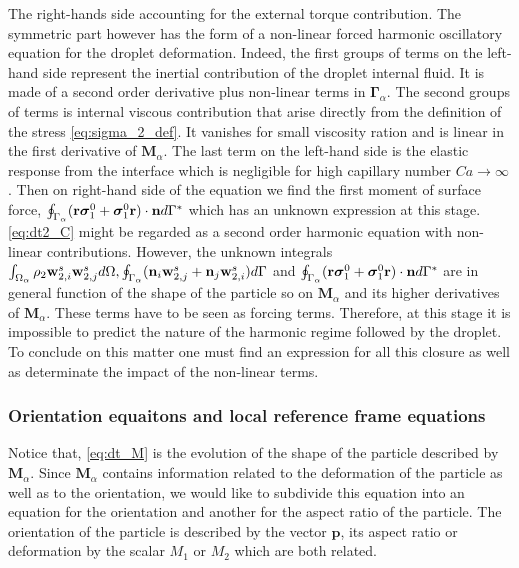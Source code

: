 The right-hands side accounting for the external torque contribution. 
The symmetric part however has the form of a non-linear forced harmonic oscillatory equation for the droplet deformation. 
Indeed, the first groups of terms on the left-hand side represent the inertial contribution of the droplet internal fluid. 
It is made of a second order derivative plus non-linear terms in $\bm\Gamma_\alpha$. 
The second groups of terms is internal viscous contribution that arise directly from the definition of the stress \ref{eq:sigma_2_def}. 
It vanishes for small viscosity ration and is linear in the first derivative of $\textbf{M}_\alpha$. 
The last term on the left-hand side is the elastic response from the interface which is negligible for high capillary number $Ca \to \infty$. 
Then on right-hand side of the equation we find the first moment of surface force, $\oint_{\Gamma_{\alpha}} (\textbf{r}\bm\sigma_1^0+ \bm\sigma_1^0\textbf{r})\cdot \textbf{n} d\Gamma^*$ which has an unknown expression at this stage. 
\ref{eq:dt2_C} might be regarded as a second order harmonic equation with non-linear contributions. 
However, the unknown integrals $\int_{\Omega_{\alpha}} \rho_2 \textbf{w}_{2,i}^s\textbf{w}_{2,j}^s d\Omega,
\oint_{\Gamma_{\alpha}} (\textbf{n}_i \textbf{w}_{2,j}^s + \textbf{n}_j \textbf{w}_{2,i}^s) d\Gamma$ and $\oint_{\Gamma_{\alpha}} (\textbf{r}\bm\sigma_1^0+ \bm\sigma_1^0\textbf{r})\cdot \textbf{n} d\Gamma^*$ are in general function of the shape of the particle so on $\textbf{M}_\alpha$ and its higher derivatives of $\textbf{M}_\alpha$.
These terms have to be seen as forcing terms. 
Therefore, at this stage it is impossible to predict the nature of the harmonic regime followed by the droplet. 
To conclude on this matter one must find an expression for all this closure as well as determinate the impact of the non-linear terms.

\subsubsection{Orientation equaitons and local reference frame equations }
 
Notice that, \ref{eq:dt_M} is the evolution of the shape of the particle described by $\textbf{M}_\alpha$.
Since $\textbf{M}_\alpha$ contains information related to the deformation of the particle as well as to the orientation, we would like to subdivide this equation into an equation for the orientation and another for the aspect ratio of the particle.
The orientation of the particle is described by the vector $\textbf{p}$, its aspect ratio or deformation by the scalar $M_1$ or $M_2$ which are both related. 



